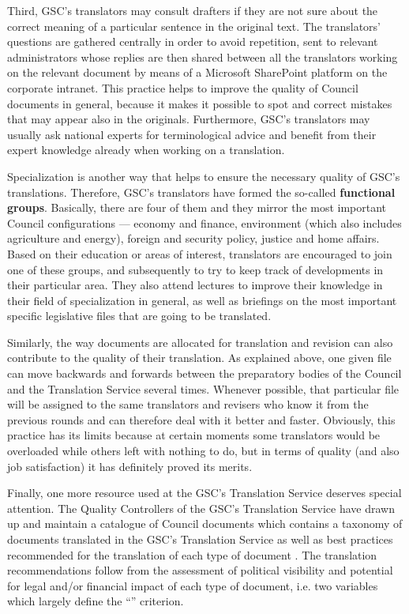 \documentclass[output=paper]{langsci/langscibook}
\begin{document}
Third, GSC’s translators may consult drafters if they are not sure about the correct meaning of a particular sentence in the original text. The translators’ questions are gathered centrally in order to avoid repetition, sent to relevant administrators whose replies are then shared between all the translators working on the relevant document by means of a Microsoft SharePoint platform on the corporate intranet. This practice helps to improve the quality of Council documents in general, because it makes it possible to spot and correct mistakes that may appear also in the originals. Furthermore, GSC’s translators may usually ask national experts for terminological advice and benefit from their expert knowledge already when working on a translation.

Specialization is another way that helps to ensure the necessary quality of GSC’s translations. Therefore, GSC’s translators have formed the so-called \textbf{functional groups}. Basically, there are four of them and they mirror the most important Council configurations — economy and finance, environment (which also includes agriculture and energy), foreign and security policy, justice and home affairs. Based on their education or areas of interest, translators are encouraged to join one of these groups, and subsequently to try to keep track of developments in their particular area. They also attend lectures to improve their knowledge in their field of specialization in general, as well as briefings on the most important specific legislative files that are going to be translated.

Similarly, the way documents are allocated for translation and revision can also contribute to the quality of their translation. As explained above, one given file can move backwards and forwards between the preparatory bodies of the Council and the Translation Service several times. Whenever possible, that particular file will be assigned to the same translators and revisers who know it from the previous rounds and can therefore deal with it better and faster. Obviously, this practice has its limits because at certain moments some translators would be overloaded while others left with nothing to do, but in terms of quality (and also job satisfaction) it has definitely proved its merits.

Finally, one more resource used at the GSC’s Translation Service deserves special attention. The Quality Controllers of the GSC’s Translation Service have drawn up and maintain a catalogue of Council documents which contains a taxonomy of documents translated in the GSC’s Translation Service as well as best practices recommended for the translation of each type of document \citep{Council2010b}. The translation recommendations follow from the assessment of political visibility and potential for legal and/or financial impact of each type of document, i.e. two variables which largely define the “” criterion.
\end{document}
